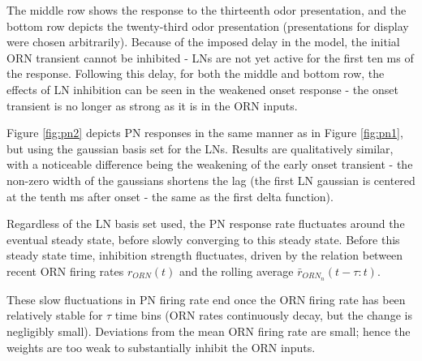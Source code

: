 \documentclass[a4paper,12pt,twoside]{article}
\begin{document}
The middle row shows the response to the thirteenth odor presentation, and the bottom row depicts the twenty-third odor presentation (presentations for display were chosen arbitrarily).  Because of the imposed delay in the model, the initial ORN transient cannot be inhibited - LNs are not yet active for the first ten ms of the response.  Following this delay, for both the middle and bottom row, the effects of LN inhibition can be seen in the weakened onset response - the onset transient is no longer as strong as it is in the ORN inputs.  

Figure \ref{fig:pn2} depicts PN responses in the same manner as in Figure \ref{fig:pn1}, but using the gaussian basis set for the LNs. Results are qualitatively similar, with a noticeable difference being the weakening of the early onset transient - the non-zero width of the gaussians shortens the lag (the first LN gaussian is centered at the tenth ms after onset - the same as the first delta function).  

Regardless of the LN basis set used, the PN response rate fluctuates around the eventual steady state, before slowly converging to this steady state.  Before this steady state time, inhibition strength fluctuates, driven by the relation between recent ORN firing rates $r_{ORN}(t)$ and the rolling average $\bar{r}_{ORN_n}(t - \tau : t).$  

These slow fluctuations in PN firing rate end once the ORN firing rate has been relatively stable for $\tau$ time bins (ORN rates continuously decay, but the change is negligibly small).  Deviations from the mean ORN firing rate are small; hence the weights are too weak to substantially inhibit the ORN inputs.
\end{document}
